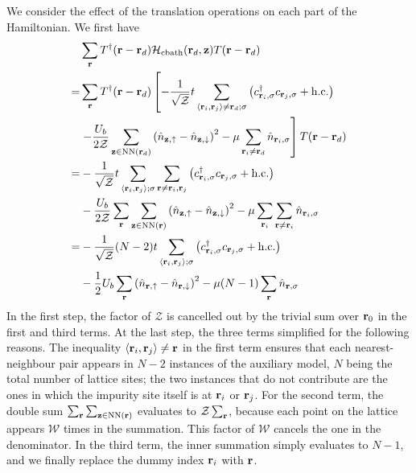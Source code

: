 \documentclass[reprint,hidelinks]{revtex4-2}
\begin{document}
We consider the effect of the translation operations on each part of the Hamiltonian. We first have
\begin{equation}\begin{aligned}
	&\sum_{{\bf r}}T^\dagger({\bf r} - {\bf r}_d)\mathcal{H}_\text{cbath}({\bf r}_d, {\bf z})T({\bf r} - {\bf r}_d) \\
	=& \sum_{{\bf r}}T^\dagger({\bf r} - {\bf r}_d)\left[-\frac{1}{\sqrt\mathcal{Z}}t\sum_{\left<{\bf r}_i, {\bf r}_j\right>\neq{\bf r}_d;\sigma}\left(c^\dagger_{{\bf r}_i,\sigma}c_{{\bf r}_j,\sigma} + \text{h.c.}\right) \right.\\
	 &\left.- \frac{U_b}{2\mathcal{Z}}\sum_{{\bf z}\in\text{NN}({\bf r}_d)}\left(\hat n_{{\bf z}, \uparrow} - \hat n_{{\bf z}, \downarrow}\right)^2 - \mu \sum_{{\bf r}_i \neq {\bf r}_d}\hat n_{{\bf r}_i,\sigma}\right]T({\bf r} - {\bf r}_d) \\
	=& -\frac{1}{\sqrt\mathcal{Z}}t\sum_{\left<{\bf r}_i, {\bf r}_j\right>;\sigma}\sum_{{\bf r}\neq{\bf r}_i,{\bf r}_j}\left(c^\dagger_{{\bf r}_i,\sigma}c_{{\bf r}_j,\sigma} + \text{h.c.}\right) \\
	 &- \frac{U_b}{2\mathcal{Z}}\sum_{\bf r}\sum_{{\bf z}\in\text{NN}\left({\bf r}\right)}\left(\hat n_{{\bf z}, \uparrow} - \hat n_{{\bf z}, \downarrow}\right)^2 - \mu \sum_{{\bf r}_i}\sum_{{\bf r} \neq {\bf r}_i}\hat n_{{\bf r}_i,\sigma}\\
	=& -\frac{1}{\sqrt\mathcal{Z}}(N-2)t\sum_{\left<{\bf r}_i, {\bf r}_j\right>;\sigma}\left(c^\dagger_{{\bf r}_i,\sigma}c_{{\bf r}_j,\sigma} + \text{h.c.}\right)\\
	 &- \frac{1}{2}U_b\sum_{\bf r}\left(\hat n_{{\bf r} , \uparrow} - \hat n_{{\bf r} , \downarrow}\right)^2 - \mu (N-1) \sum_{{\bf r}}\hat n_{{\bf r},\sigma}\\
\end{aligned}\end{equation}
In the first step, the factor of \(\mathcal{Z}\) is cancelled out by the trivial sum over \({\bf r}_0\) in the first and third terms. At the last step, the three terms simplified for the following reasons. The inequality \(\left<{\bf r}_i, {\bf r}_j\right>\neq{\bf r}\) in the first term ensures that each nearest-neighbour pair appears in \(N-2\) instances of the auxiliary model, \(N\) being the total number of lattice sites; the two instances that do not contribute are the ones in which the impurity site itself is at \({\bf r}_i\) or \({\bf r}_j\). For the second term, the double sum \(\sum_{\bf r}\sum_{{\bf z} \in \text{NN}({\bf r})}\) evaluates to \(\mathcal{Z}\sum_{\bf r}\), because each point on the lattice appears \(\mathcal{W}\) times in the summation. This factor of \(\mathcal{W}\) cancels the one in the denominator. In the third term, the inner summation simply evaluates to \(N-1\), and we finally replace the dummy index \({\bf r}_i\) with \({\bf r}\). 
\end{document}
